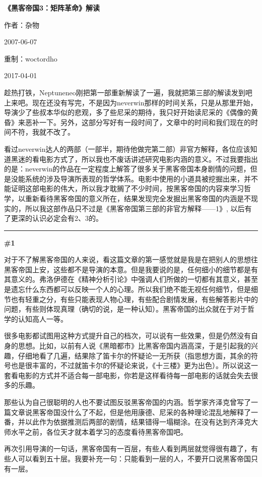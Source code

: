 \documentclass[UTF8]{ctexart}
\newcommand{\myparsep}{\noindent \rule[0.5ex]{\linewidth}{1pt}}
\newcommand{\mysection}[1]{\vspace{1ex} {\centering \bf \#1 \par} \vspace{1ex}}
\begin{document}
\centerline{\bf \fontsize{15.75pt} \baselineskip \selectfont《黑客帝国3：矩阵革命》解读}
\vspace{12pt}
\centerline{作者：杂物}
\centerline{2007-06-07}
\centerline{重制：woctordho}
\centerline{2017-04-01}
\vspace{12pt}

趁热打铁，Neptuneneo刚把第一部重新解读了一遍，我就把第三部的解读发到吧上来吧。现在还没有写完，不是因为neverwin那样的时间关系，只是从那里开始，导演少了些叔本华似的悲观，多了些尼采的期待，我只好开始读尼采的《偶像的黄昏》来恶补一下。另外，这部分写好有一段时间了，文章中的时间和我们现在的时间不符，我就不改了。

看过neverwin达人的两部（一部半，期待他做完第二部）非官方解释，各位应该知道黑迷的看电影方式了，所以我也不废话讲述研究电影内涵的意义。不过我要指出的是：neverwin的作品在一定程度上解答了很多关于黑客帝国本身剧情的问题，但是没能系统的涉及导演所表现的哲学体系。电影中使用的小道具被挖掘出来，并不能证明这部电影的伟大，所以我才耽搁了不少时间，按黑客帝国的内容来学习哲学，以重新看待黑客帝国的意义所在，结果发现完全发掘出黑客帝国的内涵是不现实的，所以我这部作品只不过是《黑客帝国第三部的非官方解释——1》, 以后有了更深的认识必定会有2、3的。

\myparsep

\mysection{写在前面}

对于不了解黑客帝国的人来说，看这篇文章的第一感觉就是我是在把别人的思想往黑客帝国上安，这些都不是导演的本意。但是我要说的是，任何细小的细节都是有其意义的。弗洛伊德在《精神分析引论》中强调人们所做的一切都有其意义，甚至是遗忘什么东西都可以反映一个人的心理。所以我们绝不能无视任何细节，但是细节也有轻重之分，有些只能表现人物心理，有些配合剧情发展，有些解答影片中的问题，有些则体现真理（确切的说，是一种认知）。黑客帝国的出众就在于对于哲学的认知高人一等。

很多电影都试图用这种方式提升自己的档次，可以说有一些效果，但是仍然没有自身的思想。比如，以前有人说《黑暗都市》比黑客帝国内涵高深，于是引起我的兴趣，仔细地看了几遍，结果除了笛卡尔的怀疑论一无所获（指思想方面，其余的符号也是很丰富的，不过就笛卡尔的怀疑论来说，《十三楼》更为出色）。所以说这一套看电影的方式并不适合每一部电影，你若是这样看待每一部电影的话就会失去很多的乐趣。

那些认为自己很聪明的人也不要试图反驳黑客帝国的内涵。哲学家齐泽克曾写了一篇文章说黑客帝国没什么了不起，但是他用康德、尼采的各种理论混乱地解释了一番，并以此作为依据推测后两部的剧情，结果错得一塌糊涂。在没有达到齐泽克大师水平之前，各位天才就本着学习的态度看待黑客帝国吧。

再次引用导演的一句话，黑客帝国有一百层，有些人看到两层就觉得很有趣了，有些人可以看到五十层。我要补充一句：只能看到一层的人，不要开口说黑客帝国只有一层。
\end{document}
